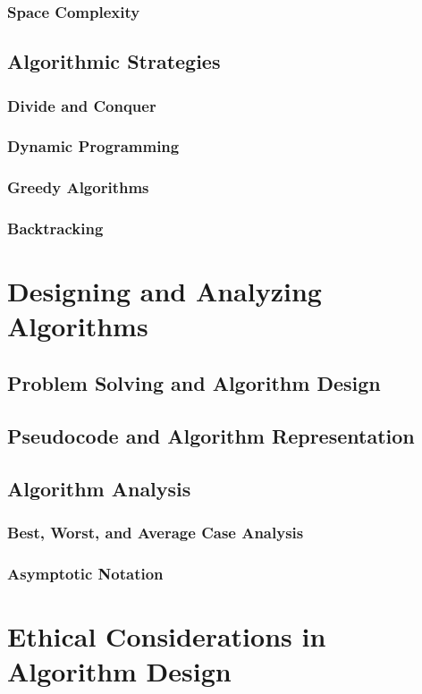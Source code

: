 \documentclass[12pt]{book} %
\begin{document}
\subsubsection{Space Complexity}
\subsection{Algorithmic Strategies}
\subsubsection{Divide and Conquer}
\subsubsection{Dynamic Programming}
\subsubsection{Greedy Algorithms}
\subsubsection{Backtracking}

\section{Designing and Analyzing Algorithms}
\subsection{Problem Solving and Algorithm Design}
\subsection{Pseudocode and Algorithm Representation}
\subsection{Algorithm Analysis}
\subsubsection{Best, Worst, and Average Case Analysis}
\subsubsection{Asymptotic Notation}


\section{Ethical Considerations in Algorithm Design}
\end{document}
